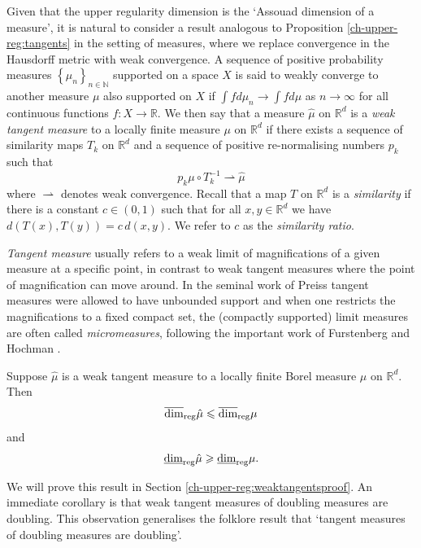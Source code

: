 Given that the upper regularity dimension is the `Assouad dimension of a measure', it is natural to consider a result analogous to Proposition \ref{ch-upper-reg:tangents} in the setting of measures, where we replace convergence in the Hausdorff metric with weak convergence. A sequence of positive probability measures $\left\{\mu_n\right\}_{n\in \mathbb{N}}$ supported on a space $X$ is said to weakly converge to another measure $\mu$ also supported on $X$ if $\int fd \mu_n \rightarrow \int fd \mu$ as $n\rightarrow \infty$ for all continuous functions $f\colon X \rightarrow \mathbb{R}$. We then say that a measure  $\hat{\mu}$ on $ \mathbb{R}^d$ is a \emph{weak tangent measure} to a locally finite measure $\mu$ on $\mathbb{R}^d$ if there exists a sequence of similarity maps $T_k$ on  $\mathbb{R}^d$ and a sequence of positive re-normalising numbers $p_k$ such that
\[
p_k \mu \circ T^{-1}_k  \rightharpoonup \hat{\mu}
\]
where $\rightharpoonup$ denotes weak convergence. Recall that a map $T$ on $\mathbb{R}^d$ is a \emph{similarity} if there is a constant $c  \in \left(0,1 \right)$ such that  for all $x,y \in \mathbb{R}^d$ we have $d(T(x) , T(y) ) = c \, d(x, y )$.  We refer to $c$ as the \emph{similarity ratio}. 

\emph{Tangent measure} usually refers to a weak limit of magnifications of a given measure at a specific point, in contrast to weak tangent measures where the point of magnification can move around. In the seminal work of Preiss \cite{preiss} tangent measures were allowed to have unbounded support and when one restricts the magnifications to a fixed compact set, the (compactly supported) limit measures are often called \emph{micromeasures}, following the important work of Furstenberg \cite{furstenberg} and Hochman \cite{hochman}.  

\begin{theorem}\label{ch-upper-reg:weaktangents}
	Suppose $\hat{\mu}$ is a weak tangent measure to a locally finite Borel measure  $\mu$ on $\mathbb{R}^d$.  Then 
	\[\overline{\dim}_{\textup{reg}} \hat{\mu} \leqslant \overline{\dim}_{\textup{reg}} \mu \]
	and
	\[\underline{\dim}_{\textup{reg}} \hat{\mu} \geqslant \underline{\dim}_{\textup{reg}} \mu.	\]
\end{theorem}

We will prove this result in Section \ref{ch-upper-reg:weaktangentsproof}.  An immediate corollary  is that weak tangent measures of doubling measures are doubling.  This observation generalises the folklore result that `tangent measures of doubling measures are doubling'.  

